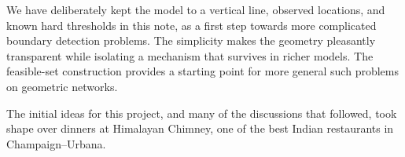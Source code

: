 \documentclass[ECP,preprint]{ejpecp} %
\newcommand{\1}{\mathbf 1}
\begin{document}
\medskip


We have deliberately kept the model to a vertical line, observed locations, and known hard thresholds in this note, as a first step towards more complicated boundary detection problems.  The simplicity makes the geometry pleasantly transparent while isolating a mechanism that survives in richer models.  The feasible-set construction provides a starting point for more general such problems on geometric networks.






\begin{acks}
The initial ideas for this project, and many of the discussions that followed,
took shape over dinners at Himalayan Chimney, one of the best Indian
restaurants in Champaign--Urbana.
\end{acks}
\end{document}
